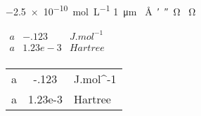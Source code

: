 \documentclass{article}
\begin{document}
\SI{-2.5e-10}{mol.L^{-1}}
\SI{1}{\micro\metre}
\SI{}{\angstrom\arcminute\arcsecond\ohm}
\vrule\SI{}{\ohm}\vrule


$\begin{array}{lSs}
  a&-.123 & J.mol^{-1} \\
  a&1.23e-3 & Hartree \\
 \end{array}$

\begin{tabular}{lSs}
  a&-.123 & J.mol^{-1} \\
  a&1.23e-3 & Hartree \\
\end{tabular}
\end{document}

